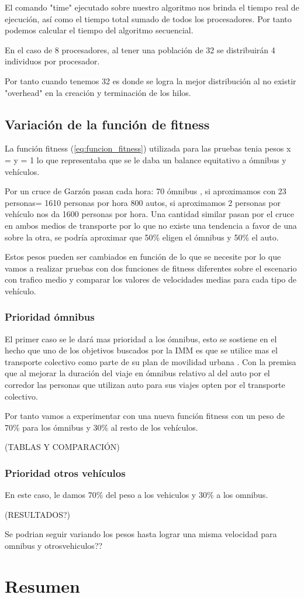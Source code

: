 El comando "time" ejecutado sobre nuestro algoritmo nos brinda el tiempo real de ejecución, así como el tiempo total sumado de todos los procesadores. Por tanto podemos calcular el tiempo del algoritmo secuencial.

En el caso de 8 procesadores, al tener una población de 32 se distribuirán 4 individuos por procesador.

Por tanto cuando tenemos 32 es donde se logra la mejor distribución al no existir "overhead" en la creación y terminación de los hilos.


\subsection{Variación de la función de fitness}

La función fitness (\ref{eq:funcion_fitness}) utilizada para las pruebas tenia pesos x = y = 1 lo que representaba que se le daba un balance equitativo a ómnibus y vehículos.

Por un cruce de Garzón pasan cada hora:
70 ómnibus , si aproximamos con 23 personas= 1610 personas por hora
800 autos, si aproximamos  2 personas por vehículo nos da 1600 personas por hora.
Una cantidad similar  pasan por el cruce en ambos medios de transporte por lo que no existe una tendencia a favor de una sobre la otra, se podría aproximar que 50\% eligen el ómnibus y 50\% el auto.



Estos pesos pueden ser cambiados en función de lo que se necesite por lo que vamos a realizar pruebas con dos funciones de fitness diferentes sobre el escenario con trafico medio y comparar los valores de velocidades medias para cada tipo de vehículo.


\subsubsection{Prioridad ómnibus}
El primer caso se le dará mas prioridad a los ómnibus, esto se sostiene en el hecho que uno de los objetivos buscados por la IMM  es que se utilice mas el transporte colectivo como parte de su plan de movilidad urbana \citep{PlanMovilidad}. Con la premisa que al mejorar la duración del viaje en ómnibus relativo al del auto por el corredor las personas que utilizan auto para sus viajes opten por el transporte colectivo.

Por tanto vamos a experimentar con una nueva función fitness con un peso de 70\% para los ómnibus y 30\% al resto de los vehículos.

(TABLAS Y COMPARACIÓN) 

\subsubsection{Prioridad otros vehículos}

En este caso, le damos 70\% del peso a los vehiculos y 30\% a los omnibus.

(RESULTADOS?)

Se podrian seguir variando los pesos hasta lograr una misma velocidad para omnibus y otrosvehiculos??


\section{Resumen}

